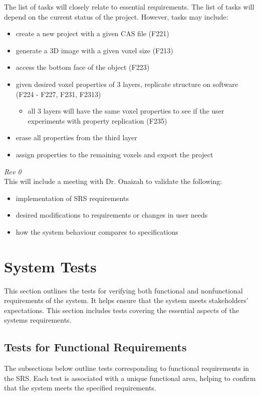 \documentclass[12pt, titlepage]{article}
\begin{document}
\noindent The list of tasks will closely relate to essential requirements. The list of tasks will depend on the current status of the project. However, tasks may include:
\begin{itemize}
\item create a new project with a given CAS file (F221)
\item generate a 3D image with a given voxel size (F213)
\item access the bottom face of the object (F223)
\item given desired voxel properties of 3 layers, replicate structure on software (F224 - F227, F231, F2313)
\begin{itemize}
\item all 3 layers will have the same voxel properties to see if the user experiments with property replication (F235)
\end{itemize}
\item erase all properties from the third layer
\item assign properties to the remaining voxels and export the project
\end{itemize}

\noindent \textit{Rev 0}\\
\noindent This will include a meeting with Dr. Onaizah to validate the following:
\begin{itemize}
\item implementation of SRS requirements
\item desired modifications to requirements or changes in user needs
\item how the system behaviour compares to specifications
\end{itemize}


\section{System Tests}

This section outlines the tests for verifying both functional and nonfunctional requirements of the system. It helps ensure that the system meets stakeholders' expectations. This section includes
tests covering the essential aspects of the systems requirements.

\subsection{Tests for Functional Requirements}

The subsections below outline tests corresponding to functional requirements in the SRS.
Each test is associated with a unique functional area, helping to confirm that the system meets
the specified requirements. 
\end{document}
